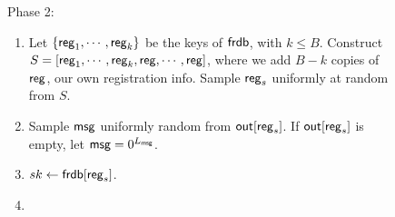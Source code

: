 \begin{figure}[h!]
\begin{framed}
\begin{definition}
Phase 2:
\begin{enumerate}
    \item Let $\{\mathsf{reg}_1, \cdots, \mathsf{reg}_k\}$ be the keys of $\mathsf{frdb}$, with $k\leq B$. Construct $S = [\mathsf{reg}_1,\cdots, \mathsf{reg}_k, \mathsf{reg}, \cdots, \mathsf{reg}]$, where we add $B - k$ copies of $\mathsf{reg}$, our own registration info. Sample $\mathsf{reg}_s$ uniformly at random from $S$.
    \item Sample $\mathsf{msg}$ uniformly random from $\mathsf{out}[\mathsf{reg}_s]$. If $\mathsf{out}[\mathsf{reg}_s]$ is empty, let $\mathsf{msg} = 0^{L_{\mathsf{msg}}}$.
    \item $sk \leftarrow \mathsf{frdb}[\mathsf{reg}_s]$.
    \item 
\end{enumerate}

\end{definition}
\end{framed}
\end{figure}
